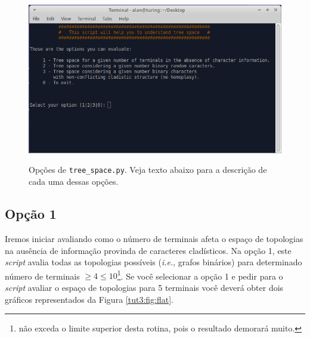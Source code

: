 \begin{refsection}
  \begin{figure}[H]
  \centering
       \centering
      {\includegraphics[scale=0.60]{figures/tut3/tree_space_prompt.png}}
      {\caption[Opções de \texttt{tree\_space.py}]{Opções de \texttt{tree\_space.py}. Veja texto abaixo para a descrição de cada uma dessas opções.}\label{tut3:fig:prompt}}
  \end{figure}


\subsection{Opção 1}\label{tut3:subs:flat}
	Iremos iniciar avaliando como o número de terminais afeta o espaço de topologias na ausência de informação provinda de caracteres cladísticos. Na opção 1, este \textit{script} avalia todas as topologias possíveis (\textit{i.e.}, grafos binários) para determinado número de terminais $\ge 4 \le 10$\footnote{não exceda o limite superior desta rotina, pois o resultado demorará muito.}. Se você selecionar a opção 1 e pedir para o \textit{script} avaliar o espaço de topologias para 5 terminais você deverá obter dois gráficos representados da Figura \ref{tut3:fig:flat}.
 


\end{refsection}
